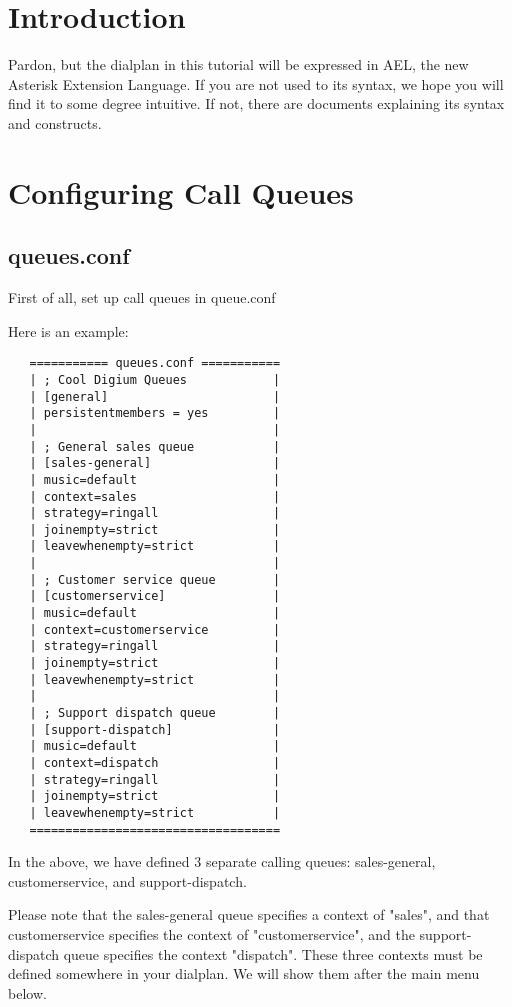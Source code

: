 
\section{Introduction}

Pardon, but the dialplan in this tutorial will be expressed
in AEL, the new Asterisk Extension Language. If you are 
not used to its syntax, we hope you will find it to some
degree intuitive. If not, there are documents explaining
its syntax and constructs.


\section{Configuring Call Queues}

\subsection{queues.conf}
First of all, set up call queues in queue.conf

Here is an example:

\begin{verbatim}
   =========== queues.conf ===========
   | ; Cool Digium Queues            |
   | [general]                       |
   | persistentmembers = yes         |
   |                                 |
   | ; General sales queue           |
   | [sales-general]                 |
   | music=default                   |
   | context=sales                   |
   | strategy=ringall                |
   | joinempty=strict                |
   | leavewhenempty=strict           |
   |                                 |
   | ; Customer service queue        |
   | [customerservice]               |
   | music=default                   |
   | context=customerservice         |
   | strategy=ringall                |
   | joinempty=strict                |
   | leavewhenempty=strict           |
   |                                 |
   | ; Support dispatch queue        |
   | [support-dispatch]              |
   | music=default                   |
   | context=dispatch                |
   | strategy=ringall                |
   | joinempty=strict                |
   | leavewhenempty=strict           |
   ===================================
\end{verbatim}

In the above, we have defined 3 separate calling queues: 
sales-general, customerservice, and support-dispatch.

Please note that the sales-general queue specifies a
context of "sales", and that customerservice specifies the
context of "customerservice", and the support-dispatch
queue specifies the context "dispatch". These three
contexts must be defined somewhere in your dialplan.
We will show them after the main menu below.

